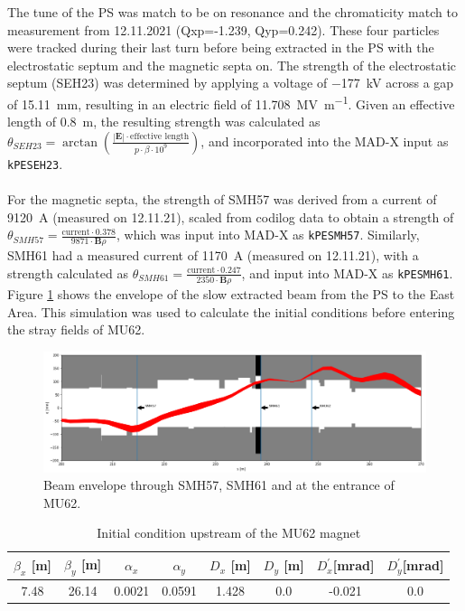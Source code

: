The tune of the PS was match to be on resonance and the chromaticity match to measurement from 12.11.2021 (Qxp=-1.239, Qyp=0.242). These four particles were tracked during their last turn before being extracted in the PS with the electrostatic septum and the magnetic septa on. The strength of the electrostatic septum (SEH23) was determined by applying a voltage of \SI{-177}{\kilo\volt} across a gap of \SI{15.11}{\milli\metre}, resulting in an electric field of \SI{11.708}{\mega\volt\per\metre}. Given an effective length of \SI{0.8}{\metre}, the resulting strength was calculated as $\theta_{SEH23} = \arctan \left( \frac{|\mathbf{E}| \cdot \text{effective length}}{p \cdot \beta \cdot 10^9} \right)$, and incorporated into the MAD-X input as \texttt{kPESEH23}.
\\
\\
For the magnetic septa, the strength of SMH57 was derived from a current of \SI{9120}{\ampere} (measured on 12.11.21), scaled from codilog data to obtain a strength of $\theta_{SMH57} = \frac{\text{current} \cdot 0.378}{9871 \cdot \mathbf{B} \rho}$, which was input into MAD-X as \texttt{kPESMH57}. Similarly, SMH61 had a measured current of \SI{1170}{\ampere} (measured on 12.11.21), with a strength calculated as $\theta_{SMH61} = \frac{\text{current} \cdot 0.247}{2350 \cdot \mathbf{B} \rho}$, and input into MAD-X as \texttt{kPESMH61}. Figure \ref{fig:beam_envelope} shows the envelope of the slow extracted beam from the PS to the East Area. This simulation was used to calculate the initial conditions before entering the stray fields of MU62.


\begin{figure}[H]
\centering
\includegraphics[width=1.0\textwidth]{02_Simulation/images/beam_envelope.png}
\caption{Beam envelope through SMH57, SMH61 and at the entrance of MU62.}
\label{fig:beam_envelope}
\end{figure}


\begin{table}[htbp]
\centering
\caption{Initial condition upstream of the MU62 magnet}
\label{tab:twiss_parameters}
\begin{tabular}{|c|c|c|c|c|c|c|c|}
\hline
$\beta_{x}$ [m] & $\beta_{y}$ [m] & $\alpha_{x}$ & $\alpha_{y}$ & $D_{x}$ [m] & $D_{y}$ [m] & $D^{'}_{x}$[mrad] & $D^{'}_{y}$[mrad] \\
\hline
7.48 & 26.14 & 0.0021 & 0.0591 & 1.428 & 0.0 & -0.021 & 0.0 \\
\hline
\end{tabular}
\end{table}


